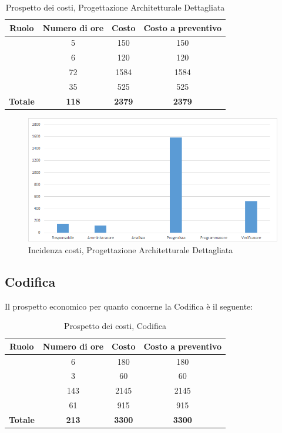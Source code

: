 \begin{table}[H]
	\begin{center}
		\begin{tabular}{|c|c|c|c|}
			\hline
			\textbf{Ruolo}	& \textbf{Numero di ore} & \textbf{Costo} & \textbf{Costo a preventivo}\\
			\hline
			\Res	&	5  &	150	  &	150\\
			\hline
			\Amm	&	6  &	120  &	120	\\
			\hline
			\Prog	&	72  &	1584  &	1584	\\
			\hline
			\Ver	&	35  &	525  &	525	\\
			\hline
			\textbf{Totale}  & \textbf{118} &	\textbf{2379} &	\textbf{2379}	\\
			\hline
		\end{tabular}
	\end{center}
	\caption{Prospetto dei costi, Progettazione Architetturale Dettagliata }
\end{table}

\begin{figure}[H]
	\centering
	\includegraphics[scale=0.6]{img/8-3.png}
	\caption{Incidenza costi, Progettazione Architetturale Dettagliata}
\end{figure}

\subsection{Codifica}
Il prospetto economico per quanto concerne la Codifica è il seguente:


\begin{table}[H]
	\begin{center}
		\begin{tabular}{|c|c|c|c|}
			\hline
			\textbf{Ruolo}	& \textbf{Numero di ore} & \textbf{Costo} & \textbf{Costo a preventivo}\\
			\hline
			\Res	&	6  &	180  &	180	\\
			\hline
			\Amm	&	3  &	60  &	60	\\
			\hline
			\Progr	&	143  &	2145  &	2145	\\
			\hline
			\Ver	&	61  &	915  &	915		\\
			\hline
			\textbf{Totale}  &	\textbf{213} &	\textbf{3300} &	\textbf{3300}	\\
			\hline
		\end{tabular}
	\end{center}
	\caption{Prospetto dei costi, Codifica }
\end{table}

